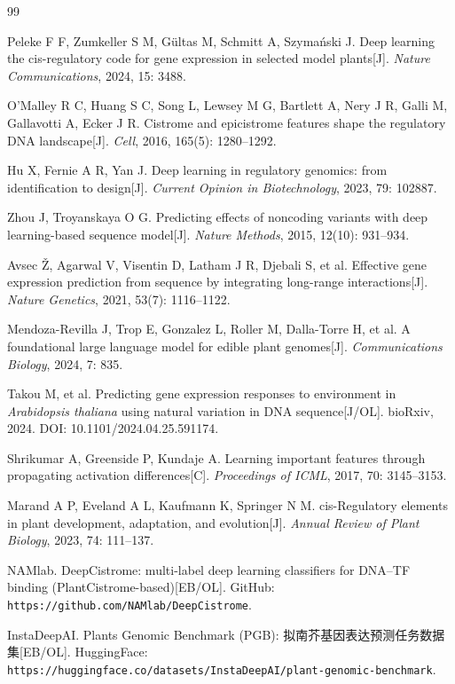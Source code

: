 \documentclass[UTF8,11pt,a4paper]{ctexart}
\begin{document}
\begin{thebibliography}{99}
\small
\setlength{\itemsep}{2pt}

Peleke F F, Zumkeller S M, Gültas M, Schmitt A, Szymański J.
Deep learning the cis-regulatory code for gene expression in selected model plants[J].
\emph{Nature Communications}, 2024, 15: 3488.

O'Malley R C, Huang S C, Song L, Lewsey M G, Bartlett A, Nery J R, Galli M, Gallavotti A, Ecker J R.
Cistrome and epicistrome features shape the regulatory DNA landscape[J].
\emph{Cell}, 2016, 165(5): 1280--1292.

Hu X, Fernie A R, Yan J.
Deep learning in regulatory genomics: from identification to design[J].
\emph{Current Opinion in Biotechnology}, 2023, 79: 102887.

Zhou J, Troyanskaya O G.
Predicting effects of noncoding variants with deep learning-based sequence model[J].
\emph{Nature Methods}, 2015, 12(10): 931--934.

Avsec Ž, Agarwal V, Visentin D, Latham J R, Djebali S, et al.
Effective gene expression prediction from sequence by integrating long-range interactions[J].
\emph{Nature Genetics}, 2021, 53(7): 1116--1122.

Mendoza-Revilla J, Trop E, Gonzalez L, Roller M, Dalla-Torre H, et al.
A foundational large language model for edible plant genomes[J].
\emph{Communications Biology}, 2024, 7: 835.

Takou M, et al.
Predicting gene expression responses to environment in \emph{Arabidopsis thaliana} using natural variation in DNA sequence[J/OL].
bioRxiv, 2024. DOI: 10.1101/2024.04.25.591174.

Shrikumar A, Greenside P, Kundaje A.
Learning important features through propagating activation differences[C].
\emph{Proceedings of ICML}, 2017, 70: 3145--3153.

Marand A P, Eveland A L, Kaufmann K, Springer N M.
cis-Regulatory elements in plant development, adaptation, and evolution[J].
\emph{Annual Review of Plant Biology}, 2023, 74: 111--137.

NAMlab. DeepCistrome: multi-label deep learning classifiers for DNA--TF binding (PlantCistrome-based)[EB/OL].
GitHub: \texttt{https://github.com/NAMlab/DeepCistrome}.

InstaDeepAI. Plants Genomic Benchmark (PGB): 拟南芥基因表达预测任务数据集[EB/OL].
HuggingFace: \texttt{https://huggingface.co/datasets/InstaDeepAI/plant-genomic-benchmark}.

\end{thebibliography}
\end{document}
